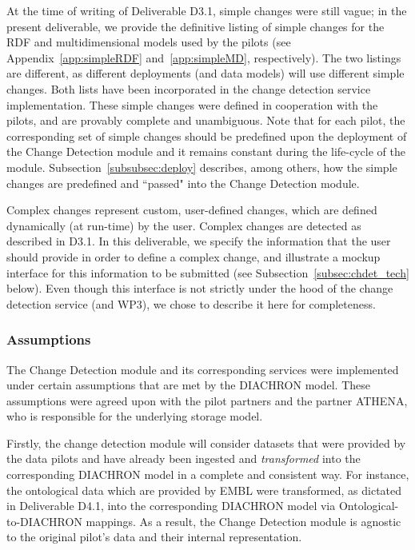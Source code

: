 At the time of writing of Deliverable D3.1, simple changes were still vague; in the present deliverable, we provide the definitive listing of simple changes for the RDF and multidimensional models used by the pilots (see Appendix~\ref{app:simpleRDF} and~\ref{app:simpleMD}, respectively). The two listings are different, as different deployments (and data models) will use different simple changes. 
Both lists have been incorporated in the change detection service implementation.
These simple changes were defined in cooperation with the pilots, and are provably complete and unambiguous. Note that for each pilot, the corresponding set of simple changes should be predefined upon the deployment of the Change Detection module and it remains constant during the life-cycle of the module. Subsection~\ref{subsubsec:deploy} describes, among others, how the simple changes are predefined and ``passed" into the Change Detection module. 

Complex changes represent custom, user-defined changes, which are defined dynamically (at run-time) by the user. Complex changes are detected as described in D3.1. In this deliverable, we specify the information that the user should provide in order to define a complex change, and illustrate a mockup interface for this information to be submitted (see Subsection~\ref{subsec:chdet_tech} below). Even though this interface is not strictly under the hood of the change detection service (and WP3), we chose to describe it here for completeness.

\subsubsection{Assumptions}

The Change Detection module and its corresponding services were implemented under certain assumptions that are met by the DIACHRON model. These assumptions were agreed upon with the pilot partners and the partner ATHENA, who is responsible for the underlying storage model.

Firstly, the change detection module will consider datasets that were provided by the data pilots and have already been ingested and \emph{transformed} into the corresponding DIACHRON model in a complete and consistent way. For instance, the ontological data which are provided by EMBL were transformed, as dictated in Deliverable D4.1, into the corresponding DIACHRON model via Ontological-to-DIACHRON mappings. As a result, the Change Detection module is agnostic to the original pilot's data and their internal representation. 

